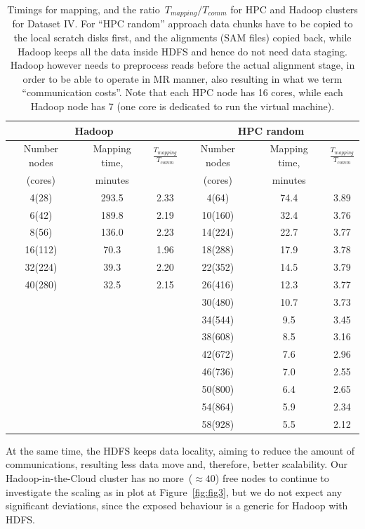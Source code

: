 \documentclass[11pt, oneside]{article}   	%
\begin{document}
\begin{table}[htdp]
\caption{Timings  for mapping, and the ratio~$T_{mapping}/T_{comm}$  for HPC and  Hadoop clusters for Dataset IV.
For ``HPC random'' approach data chunks have to be copied to the local scratch disks first, and the alignments (SAM files) copied back, while Hadoop keeps all the data inside HDFS and hence do not need data staging. Hadoop however needs to preprocess reads before the actual alignment stage, in order  to be able to operate in MR manner, also resulting in what we term ``communication costs''. Note that each HPC node has 16 cores, while each Hadoop node has 7 (one core is dedicated to run the virtual machine).}
\begin{center}
\begin{tabular}{|c|c|c|c|c|c|}
 \multicolumn{3}{|c|}{Hadoop} & \multicolumn{3}{c|}{ HPC random} \\
 \hline		


Number nodes	&Mapping time,	&$\frac{T_{mapping}}{T_{comm}}$	&Number  nodes	&Mapping time,	&$\frac{T_{mapping}}{T_{comm}}$\\
(cores)					&minutes		&							&(cores)			&minutes&\\
\hline
4(28)	&293.5	&2.33	&4(64)	&74.4	&3.89\\
6(42)	&189.8	&2.19	&10(160)	&32.4	&3.76\\
8(56)	&136.0	&2.23	&14(224)	&22.7	&3.77\\
16(112)	&70.3	&1.96	&18(288)	&17.9	&3.78\\
32(224)	&39.3	&2.20	&22(352)	&14.5	&3.79\\
40(280)	&32.5	&2.15	&26(416)	&12.3	&3.77\\
			&&&30(480)	&10.7	&3.73\\
			&&&34(544)	&9.5	&3.45\\
			&&&38(608)	&8.5	&3.16\\
			&&&42(672)	&7.6	&2.96\\
			&&&46(736)	&7.0	&2.55\\
			&&&50(800)	&6.4	&2.65\\
			&&&54(864)	&5.9	&2.34\\
			&&&58(928)	&5.5	&2.12\\

\end{tabular}
\end{center}
\label{table:6}
\end{table}%
 At the same time, the HDFS keeps data locality, aiming to reduce the amount of communications, resulting less data move and, therefore, better scalability.
Our Hadoop-in-the-Cloud cluster has no more~($\approx 40$) free nodes to continue to investigate the scaling as in plot at Figure~\ref{fig:fig3}, but we do not expect any significant deviations, since the exposed behaviour is a generic for Hadoop with HDFS.
\end{document}
